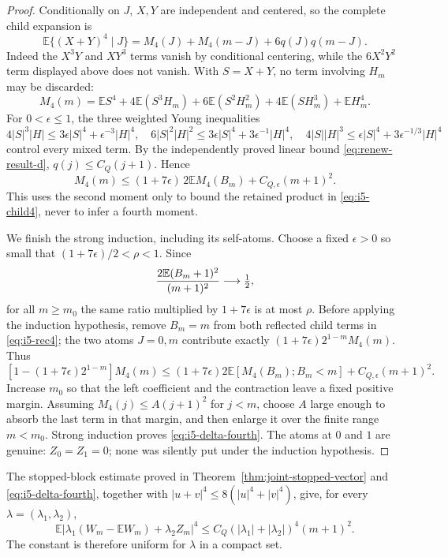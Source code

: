 \documentclass[11pt]{article}
\numberwithin{equation}{section}
\newcommand{\1}{\mathbf 1}\newcommand{\F}{\mathcal F}\newcommand{\D}{\mathcal D}
\begin{document}
\begin{proof}
Conditionally on $J$, $X,Y$ are independent and centered, so the complete
child expansion is
\begin{equation}
 \mathbb E\{(X+Y)^4\mid J\}=M_4(J)+M_4(m-J)+6q(J)q(m-J).           \tag{5.7}\label{eq:i5-child4}
\end{equation}
Indeed the $X^3Y$ and $XY^3$ terms vanish by conditional centering, while the
$6X^2Y^2$ term displayed above does not vanish.  With $S=X+Y$, no term
involving $H_m$ may be discarded:
\begin{equation}
 M_4(m)=\mathbb ES^4+4\mathbb E(S^3H_m)+6\mathbb E(S^2H_m^2)
       +4\mathbb E(SH_m^3)+\mathbb EH_m^4.                         \tag{5.8}\label{eq:i5-full4}
\end{equation}
For $0<\epsilon\le1$, the three weighted Young inequalities
\[
4|S|^3|H|\le3\epsilon|S|^4+\epsilon^{-3}|H|^4,
\quad6|S|^2|H|^2\le3\epsilon|S|^4+3\epsilon^{-1}|H|^4,
\quad4|S||H|^3\le\epsilon|S|^4+3\epsilon^{-1/3}|H|^4
\]
control every mixed term.  By the independently proved linear bound
\eqref{eq:renew-result-d}, $q(j)\le C_Q(j+1)$.  Hence
\begin{equation}
 M_4(m)\le(1+7\epsilon)\,2\mathbb EM_4(B_m)+C_{Q,\epsilon}(m+1)^2. \tag{5.9}\label{eq:i5-rec4}
\end{equation}
This uses the second moment only to bound the retained product in
\eqref{eq:i5-child4}, never to infer a fourth moment.

We finish the strong induction, including its self-atoms.  Choose a fixed
$\epsilon>0$ so small that $(1+7\epsilon)/2<\rho<1$.  Since
\[
 {2\mathbb E(B_m+1)^2\over(m+1)^2}\longrightarrow\tfrac12,
\]
for all $m\ge m_0$ the same ratio multiplied by $1+7\epsilon$ is at most
$\rho$.  Before applying the induction hypothesis, remove $B_m=m$ from both
reflected child terms in \eqref{eq:i5-rec4}; the two atoms $J=0,m$ contribute
exactly $(1+7\epsilon)2^{1-m}M_4(m)$.  Thus
\[
 [1-(1+7\epsilon)2^{1-m}]M_4(m)
 \le (1+7\epsilon)2\mathbb E[M_4(B_m);B_m<m]+C_{Q,\epsilon}(m+1)^2.
\]
Increase $m_0$ so that the left coefficient and the contraction leave a
fixed positive margin.  Assuming $M_4(j)\le A(j+1)^2$ for $j<m$, choose $A$
large enough to absorb the last term in that margin, and then enlarge it over
the finite range $m<m_0$.  Strong induction proves \eqref{eq:i5-delta-fourth}.
The atoms at $0$ and $1$ are genuine: $Z_0=Z_1=0$; none was silently put
under the induction hypothesis.
\end{proof}

The stopped-block estimate proved in Theorem~\ref{thm:joint-stopped-vector}
and \eqref{eq:i5-delta-fourth}, together with
$|u+v|^4\le8(|u|^4+|v|^4)$, give, for every
$\lambda=(\lambda_1,\lambda_2)$,
\begin{equation}
 \mathbb E|\lambda_1(W_m-\mathbb EW_m)+\lambda_2Z_m|^4
 \le C_Q(|\lambda_1|+|\lambda_2|)^4(m+1)^2.             \tag{5.10}\label{eq:i5-cw4}
\end{equation}
The constant is therefore uniform for $\lambda$ in a compact set.
\end{document}
